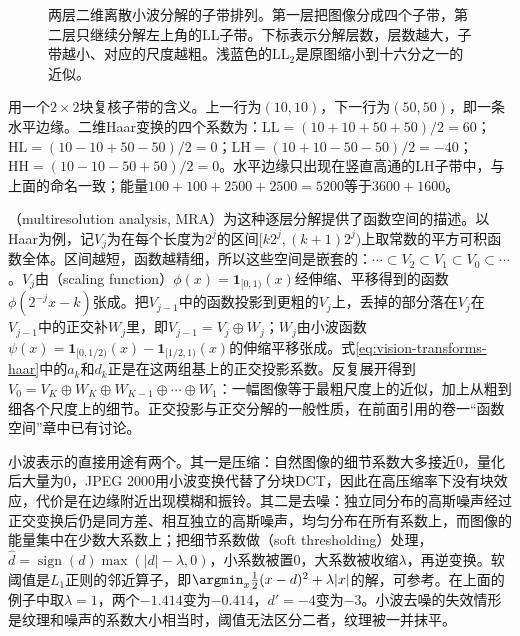 \begin{figure}[htbp]
  \centering
  
  \caption{两层二维离散小波分解的子带排列。第一层把图像分成四个子带，第二层只继续分解左上角的LL子带。下标表示分解层数，层数越大，子带越小、对应的尺度越粗。浅蓝色的$\mathrm{LL}_2$是原图缩小到十六分之一的近似。}
  \label{fig:vision-transforms-wavelet-subbands}
\end{figure}

用一个$2\times2$块复核子带的含义。上一行为$(10,10)$，下一行为$(50,50)$，即一条水平边缘。二维Haar变换的四个系数为：$\mathrm{LL}=(10+10+50+50)/2=60$；$\mathrm{HL}=(10-10+50-50)/2=0$；$\mathrm{LH}=(10+10-50-50)/2=-40$；$\mathrm{HH}=(10-10-50+50)/2=0$。水平边缘只出现在竖直高通的LH子带中，与上面的命名一致；能量$100+100+2500+2500=5200$等于$3600+1600$。

（multiresolution analysis, MRA）为这种逐层分解提供了函数空间的描述。以Haar为例，记$V_j$为在每个长度为$2^j$的区间$[k2^j,(k+1)2^j)$上取常数的平方可积函数全体。区间越短，函数越精细，所以这些空间是嵌套的：$\cdots\subset V_2\subset V_1\subset V_0\subset\cdots$。$V_j$由（scaling function）$\phi(x)=\mathbf{1}_{[0,1)}(x)$经伸缩、平移得到的函数$\phi(2^{-j}x-k)$张成。把$V_{j-1}$中的函数投影到更粗的$V_j$上，丢掉的部分落在$V_j$在$V_{j-1}$中的正交补$W_j$里，即$V_{j-1}=V_j\oplus W_j$；$W_j$由小波函数$\psi(x)=\mathbf{1}_{[0,1/2)}(x)-\mathbf{1}_{[1/2,1)}(x)$的伸缩平移张成。式\eqref{eq:vision-transforms-haar}中的$a_k$和$d_k$正是在这两组基上的正交投影系数。反复展开得到$V_0=V_K\oplus W_K\oplus W_{K-1}\oplus\cdots\oplus W_1$：一幅图像等于最粗尺度上的近似，加上从粗到细各个尺度上的细节。正交投影与正交分解的一般性质，在前面引用的卷一“函数空间”章中已有讨论。

小波表示的直接用途有两个。其一是压缩：自然图像的细节系数大多接近0，量化后大量为0，JPEG 2000用小波变换代替了分块DCT，因此在高压缩率下没有块效应，代价是在边缘附近出现模糊和振铃。其二是去噪：独立同分布的高斯噪声经过正交变换后仍是同方差、相互独立的高斯噪声，均匀分布在所有系数上，而图像的能量集中在少数大系数上；把细节系数做（soft thresholding）处理，$\hat d=\operatorname{sign}(d)\max(|d|-\lambda,0)$，小系数被置0，大系数被收缩$\lambda$，再逆变换。软阈值是$L_1$正则的邻近算子，即$\argmin_x\tfrac12(x-d)^2+\lambda|x|$的解，可参考。在上面的例子中取$\lambda=1$，两个$-1.414$变为$-0.414$，$d'=-4$变为$-3$。小波去噪的失效情形是纹理和噪声的系数大小相当时，阈值无法区分二者，纹理被一并抹平。

